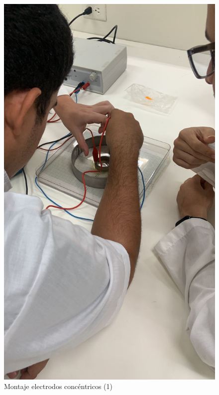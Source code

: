 \documentclass[letterpaper, 12pt]{report}
\begin{document}
\begin{figure}[H]
	\begin{center}
		\includegraphics[scale = 0.3]{./Images/1.jpeg}
		\caption{Montaje electrodos concéntricos (1)}
	\end{center}
\end{figure}
\end{document}
